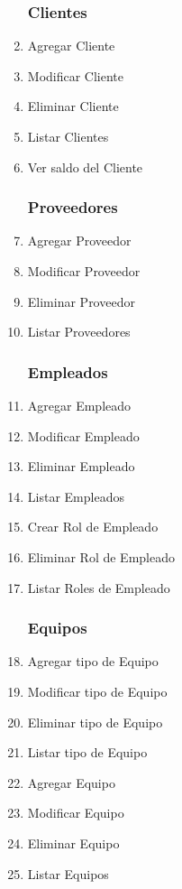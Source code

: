 \documentclass[12pt]{extarticle}
\begin{document}
\begin{spacing}{1.2}
\begin{multicols}{2}
\begin{enumerate}
        \subsubsection*{Clientes}
            \item Agregar Cliente
            \item Modificar Cliente
            \item Eliminar Cliente
            \item Listar Clientes

            \item Ver saldo del Cliente
        \subsubsection*{Proveedores}
            \item Agregar Proveedor
            \item Modificar Proveedor
            \item Eliminar Proveedor
            \item Listar Proveedores	
            \subsubsection*{Empleados}
            \item Agregar Empleado
            \item Modificar Empleado
            \item Eliminar Empleado
            \item Listar Empleados	
            \item Crear Rol de Empleado
            \item Eliminar Rol de Empleado
            \item Listar Roles de Empleado
        \subsubsection*{Equipos}
            \item Agregar tipo de Equipo
            \item Modificar tipo de Equipo
            \item Eliminar tipo de Equipo
            \item Listar tipo de Equipo
            \item Agregar Equipo
            \item Modificar Equipo
            \item Eliminar Equipo
            \item Listar Equipos

\end{enumerate}
\end{multicols}
\end{spacing}
\end{document}
